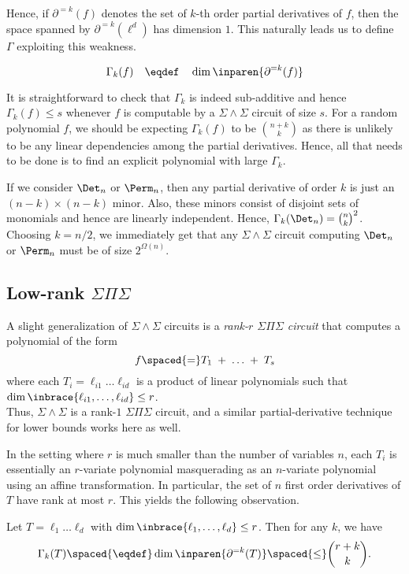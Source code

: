 Hence, if $\partial^{=k}(f)$ denotes the set of $k$-th order partial derivatives of $f$, then the space spanned by $\partial^{=k}(\ell^d)$ has dimension $1$. 
This naturally leads us to define $\Gamma$ exploiting this weakness. 

$$
\Gamma_k(f)\quad \eqdef \quad \dim \inparen{\partial^{=k}(f)}
$$

It is straightforward to check that $\Gamma_k$ is indeed sub-additive and hence $\Gamma_k(f) \leq s$ whenever $f$ is computable by a $\Sigma\!\wedge\!\Sigma$ circuit of size $s$. 
For a random polynomial $f$, we should be expecting $\Gamma_k(f)$ to be $\binom{n+k}{k}$ as there is unlikely to be any linear dependencies among the partial derivatives. 
Hence, all that needs to be done is to find an explicit polynomial with large $\Gamma_k$. 


If we consider $\Det_n$ or $\Perm_n$, then any partial derivative of order $k$ is just an $(n-k)\times(n-k)$ minor. 
Also, these minors consist of disjoint sets of monomials and hence are linearly independent. 
Hence, $\Gamma_k(\Det_n) = \binom{n}{k}^2$. 
Choosing $k = n/2$, we immediately get that any $\Sigma\!\wedge\!\Sigma$ circuit computing $\Det_n$ or $\Perm_n$ must be of size $2^{\Omega(n)}$. \\

\subsection{Low-rank $\Sigma\Pi\Sigma$}\label{sec:low-rank-sps}

A slight generalization of $\Sigma\!\wedge\!\Sigma$ circuits is a \emph{rank-$r$ $\Sigma\Pi\Sigma$ circuit} that computes a polynomial of the form 
$$
f \spaced{=}  T_1 \;+\; \dots \;+\; T_s
$$
where each $T_i = \ell_{i1}\dots \ell_{id}$ is a product of linear polynomials such that $\dim\inbrace{\ell_{i1},\dots, \ell_{id}}\leq r$. \\

Thus, $\Sigma\!\wedge\!\Sigma$  is a rank-$1$ $\Sigma\Pi\Sigma$ circuit, and a similar partial-derivative technique for lower bounds works here as well. 

In the setting where $r$ is much smaller than the number of variables $n$, each $T_i$ is essentially an $r$-variate polynomial masquerading as an $n$-variate polynomial using an affine transformation. 
In particular, the set of $n$ first order derivatives of $T$ have rank at most $r$. 
This yields the following observation.

\begin{observation}
Let $T = \ell_1\dots \ell_d$ with $\dim\inbrace{\ell_1,\dots, \ell_d}\leq r$. 
Then for any $k$, we have
$$
\Gamma_k(T) \spaced{\eqdef}\dim\inparen{\partial^{=k}(T)} \spaced{\leq} \binom{r+k}{k}.
$$
\end{observation}

